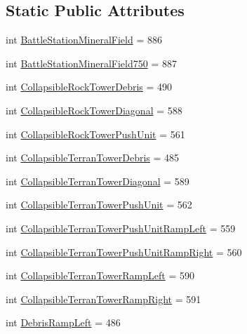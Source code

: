 \subsection*{Static Public Attributes}
\begin{DoxyCompactItemize}
\item 
int \mbox{\hyperlink{classpysc2_1_1lib_1_1units_1_1_neutral_aededb06af968e5807534fba61ba392b6}{Battle\+Station\+Mineral\+Field}} = 886
\item 
int \mbox{\hyperlink{classpysc2_1_1lib_1_1units_1_1_neutral_a6c4353dd6fab5c38d650d5a7f52da42a}{Battle\+Station\+Mineral\+Field750}} = 887
\item 
int \mbox{\hyperlink{classpysc2_1_1lib_1_1units_1_1_neutral_afc8aca3b1ecd08bbfe0e9a4997cbfc41}{Collapsible\+Rock\+Tower\+Debris}} = 490
\item 
int \mbox{\hyperlink{classpysc2_1_1lib_1_1units_1_1_neutral_afbe0a16baf1cb03a50f1169bd2c9f799}{Collapsible\+Rock\+Tower\+Diagonal}} = 588
\item 
int \mbox{\hyperlink{classpysc2_1_1lib_1_1units_1_1_neutral_ac448846754dd7e60014120cbe9ac63a6}{Collapsible\+Rock\+Tower\+Push\+Unit}} = 561
\item 
int \mbox{\hyperlink{classpysc2_1_1lib_1_1units_1_1_neutral_af99c13e4d7e1575a14ce2de1c14d764c}{Collapsible\+Terran\+Tower\+Debris}} = 485
\item 
int \mbox{\hyperlink{classpysc2_1_1lib_1_1units_1_1_neutral_a17b68d7734877039e0a529ca9601e49c}{Collapsible\+Terran\+Tower\+Diagonal}} = 589
\item 
int \mbox{\hyperlink{classpysc2_1_1lib_1_1units_1_1_neutral_a7390b218ce1f46abf822197dada66ebd}{Collapsible\+Terran\+Tower\+Push\+Unit}} = 562
\item 
int \mbox{\hyperlink{classpysc2_1_1lib_1_1units_1_1_neutral_aae94e67ae481648ab6042d0d4da09f0f}{Collapsible\+Terran\+Tower\+Push\+Unit\+Ramp\+Left}} = 559
\item 
int \mbox{\hyperlink{classpysc2_1_1lib_1_1units_1_1_neutral_acb751054dbf015881b3660bcaa702c35}{Collapsible\+Terran\+Tower\+Push\+Unit\+Ramp\+Right}} = 560
\item 
int \mbox{\hyperlink{classpysc2_1_1lib_1_1units_1_1_neutral_a78706abdd06cea1c2e9e24e1da1455d0}{Collapsible\+Terran\+Tower\+Ramp\+Left}} = 590
\item 
int \mbox{\hyperlink{classpysc2_1_1lib_1_1units_1_1_neutral_ae96bed90e58e1d0a092e716c4e967b50}{Collapsible\+Terran\+Tower\+Ramp\+Right}} = 591
\item 
int \mbox{\hyperlink{classpysc2_1_1lib_1_1units_1_1_neutral_a28d0dd911ca2e0777e6f76d5a90ab0b8}{Debris\+Ramp\+Left}} = 486

\end{DoxyCompactItemize}
